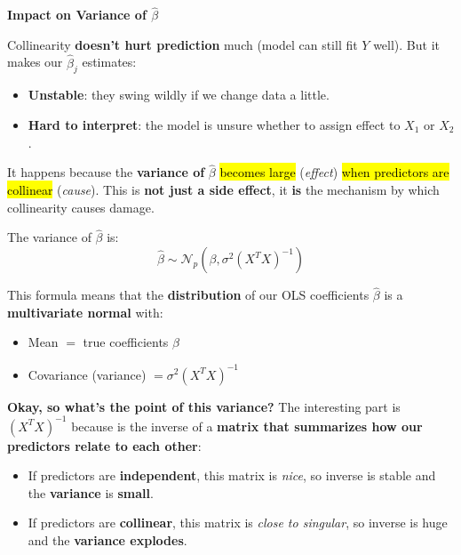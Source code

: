 \highspace
\begin{flushleft}
    \textcolor{Green3}{ \textbf{Impact on Variance of $\hat{\beta}$}}
\end{flushleft}
Collinearity \textbf{doesn't hurt prediction} much (model can still fit $Y$ well). But it makes our $\hat{\beta}_j$ estimates:
\begin{itemize}
    \item \textbf{Unstable}: they swing wildly if we change data a little.
    \item \textbf{Hard to interpret}: the model is unsure whether to assign effect to $X_1$ or $X_2$.
\end{itemize}
It happens because the \textbf{variance of} $\hat{\beta}$ \hl{becomes large} (\emph{effect}) \hl{when predictors are collinear} (\emph{cause}). This is \textbf{not just a side effect}, it \textbf{is} the mechanism by which collinearity causes damage.

\highspace
The variance of $\hat{\beta}$ is:
\begin{equation*}
    \hat{\beta} \sim \mathcal{N}_p\left(\beta, \sigma^2 \left(X^{T} X\right)^{-1} \right)
\end{equation*}

\newpage

\noindent
This formula means that the \textbf{distribution} of our OLS coefficients $\hat{\beta}$ is a \textbf{multivariate normal} with:
\begin{itemize}
    \item Mean $=$ true coefficients $\beta$
    \item Covariance (variance) $= \sigma^2 (X^{T} X)^{-1}$
\end{itemize}
\textcolor{Green3}{ \textbf{Okay, so what's the point of this variance?}} The interesting part is $\left(X^{T} X\right)^{-1}$ because is the inverse of a \textbf{matrix that summarizes how our predictors relate to each other}:
\begin{itemize}
    \item If predictors are \textbf{independent}, this matrix is \emph{nice}, so inverse is stable and the \textbf{variance} is \textbf{small}.
    \item If predictors are \textbf{collinear}, this matrix is \emph{close to singular}, so inverse is huge and the \textbf{variance explodes}.
\end{itemize}

